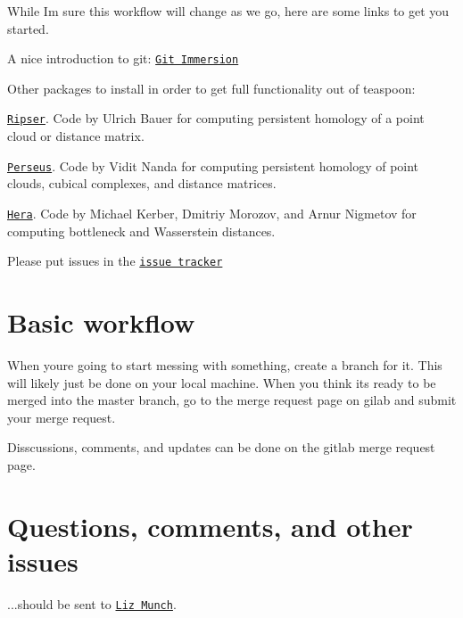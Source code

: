 While I\textquotesingle{}m sure this workflow will change as we go, here are some links to get you started.


\begin{DoxyItemize}
\item A nice introduction to git\+: \href{http://gitimmersion.com/}{\tt Git Immersion}
\item Other packages to install in order to get full functionality out of teaspoon\+:
\begin{DoxyItemize}
\item \href{https://github.com/Ripser/ripser}{\tt Ripser}. Code by Ulrich Bauer for computing persistent homology of a point cloud or distance matrix.
\item \href{http://people.maths.ox.ac.uk/nanda/perseus/index.html}{\tt Perseus}. Code by Vidit Nanda for computing persistent homology of point clouds, cubical complexes, and distance matrices.
\item \href{https://bitbucket.org/grey_narn/hera}{\tt Hera}. Code by Michael Kerber, Dmitriy Morozov, and Arnur Nigmetov for computing bottleneck and Wasserstein distances.
\end{DoxyItemize}
\item Please put issues in the \href{https://gitlab.msu.edu/TSAwithTDA/teaspoon/issues}{\tt issue tracker}
\end{DoxyItemize}

\section*{Basic workflow}

When you\textquotesingle{}re going to start messing with something, create a branch for it. This will likely just be done on your local machine. When you think it\textquotesingle{}s ready to be merged into the master branch, go to the merge request page on gilab and submit your merge request.

Disscussions, comments, and updates can be done on the gitlab merge request page.

\section*{Questions, comments, and other issues}

...should be sent to \href{mailto:muncheli@msu.edu}{\tt Liz Munch}. 